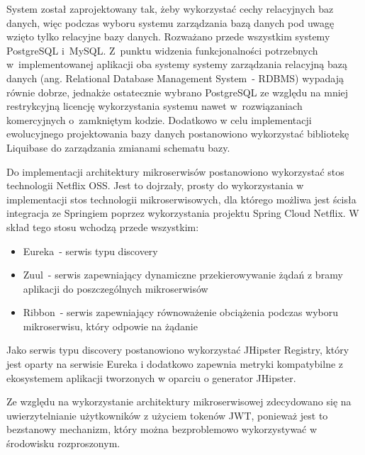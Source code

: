 \par
System został zaprojektowany tak, żeby wykorzystać cechy relacyjnych baz danych,
więc podczas wyboru systemu zarządzania bazą danych pod uwagę wzięto tylko relacyjne bazy danych.
Rozważano przede wszystkim systemy PostgreSQL\cite{tech:postgresql} i~MySQL\cite{tech:mysql}.
Z~punktu widzenia funkcjonalności potrzebnych w~implementowanej aplikacji oba systemy systemy zarządzania relacyjną bazą danych (ang. Relational Database Management System~- RDBMS) wypadają równie dobrze,
jednakże ostatecznie wybrano PostgreSQL ze względu na mniej restrykcyjną licencję wykorzystania systemu nawet w~rozwiązaniach komercyjnych o~zamkniętym kodzie.
Dodatkowo w celu implementacji ewolucyjnego projektowania bazy danych\cite{url:evolutionary-database} postanowiono wykorzystać bibliotekę Liquibase\cite{tech:liquibase} do zarządzania zmianami schematu bazy.

\par
Do implementacji architektury mikroserwisów postanowiono wykorzystać stos technologii Netflix OSS\cite{tech:netflix-oss}.
Jest to dojrzały, prosty do wykorzystania w implementacji stos technologii mikroserwisowych,
dla którego możliwa jest ścisła integracja ze Springiem poprzez wykorzystania projektu Spring Cloud Netflix\cite{tech:spring-cloud-netflix}.
W skład tego stosu wchodzą przede wszystkim:
\begin{itemize}
    \item Eureka\cite{tech:netflix-eureka}~- serwis typu discovery
    \item Zuul\cite{tech:netflix-zuul}~- serwis zapewniający dynamiczne przekierowywanie żądań z bramy aplikacji do poszczególnych mikroserwisów
    \item Ribbon\cite{tech:netflix-ribbon}~- serwis zapewniający równoważenie obciążenia podczas wyboru mikroserwisu, który odpowie na żądanie
\end{itemize}

\par
Jako serwis typu discovery postanowiono wykorzystać JHipster Registry\cite{tech:jhipster-registry}, który jest oparty na serwisie Eureka
i dodatkowo zapewnia metryki kompatybilne z ekosystemem aplikacji tworzonych w oparciu o generator JHipster.

\par
Ze względu na wykorzystanie architektury mikroserwisowej zdecydowano się na uwierzytelnianie użytkowników z użyciem tokenów JWT\cite{url:jwt},
ponieważ jest to bezstanowy mechanizm, który można bezproblemowo wykorzystywać w środowisku rozproszonym.

